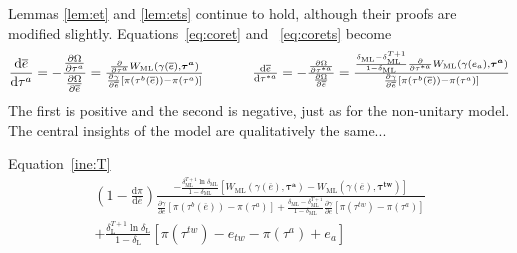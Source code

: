 \documentclass[authoryear, review]{elsarticle}
\newcommand{\ov}{\overline}
\newcommand{\bta}{\bm{\tau^a}}
\newcommand{\ga}{\gamma}
\newcommand{\btw}{\bm{\tau^{tw}}}
\newcommand{\de}{\delta}
\begin{document}
Lemmas \ref{lem:et} and \ref{lem:ets} continue to hold, although their proofs are modified slightly. Equations~\ref{eq:coret} and ~\ref{eq:corets} become
\begin{equation*}
 	\frac{\mathrm{d} \ov{e}}{\mathrm{d} \tau^a} = -\frac{\frac{\partial \Omega}{\partial \tau^a}}{\frac{\partial \Omega}{\partial \ov{e}}} =
	\textstyle \frac{\frac{\partial}{\partial \tau^a}W_\text{ML}(\ga(\ov{e}),\bta)}{\frac{\partial \ga}{\partial \ov{e}}\left[ \pi(\tau^b(\ov{e})) - \pi(\tau^{a}) \right]} \hskip.5in 	\frac{\mathrm{d} \ov{e}}{\mathrm{d} \tau^{*a}} = -\frac{\frac{\partial \Omega}{\partial \tau^{*a}}}{\frac{\partial \Omega}{\partial \ov{e}}} = 
	\textstyle \frac{\frac{\de_\text{ML} - \de_\text{ML}^{T+1}}{1-\de_\text{ML}} \frac{\partial}{\partial \tau^{*a}}W_\text{ML}(\ga(e_a),\bta)}{\frac{\partial \ga}{\partial \ov{e}}\left[ \pi(\tau^b(\ov{e})) - \pi(\tau^{a}) \right]}
\end{equation*}
The first is positive and the second is negative, just as for the non-unitary model. The central insights of the model are qualitatively the same...

Equation~\ref{ine:T}
\begin{multline}
 	\left(1 - \frac{\mathrm{d} \pi}{\mathrm{d} \ov{e}} \right) \frac{ -\frac{\de_\text{ML}^{T+1}\ln\de_\text{ML}}{1-\de_\text{ML}}\left[  W_\text{ML}(\ga(\ov{e}),\bta) - W_\text{ML}(\ga(\ov{e}),\btw) \right]}{\frac{\partial \ga}{\partial e} \left[ \pi(\tau^b(\ov{e})) - \pi(\tau^a) \right] + \frac{\de_\text{ML} - \de_\text{ML}^{T+1}}{1-\de_\text{ML}}\frac{\partial \ga}{\partial e} \left[ \pi(\tau^{tw}) - \pi(\tau^a) \right]} \\
	+  \frac{\de_\text{L}^{T+1} \ln \de_\text{L}}{1-\de_\text{L}} \left[ \pi(\tau^{tw}) - e_{tw} -\pi(\tau^a) + e_a \right]
\end{multline}
\end{document}
